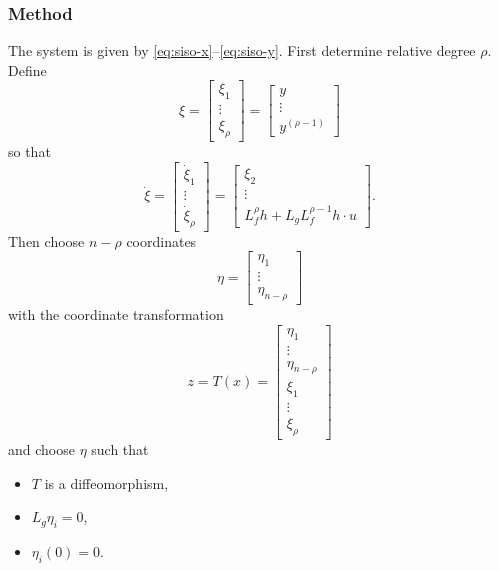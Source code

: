 \subsubsection{Method}
The system is given by \eqref{eq:siso-x}--\eqref{eq:siso-y}. First determine relative degree $\rho$. Define
\begin{equation}
	\xi =
	\begin{bmatrix}
		\xi_1 \\ \vdots \\ \xi_\rho
	\end{bmatrix}
	=
	\begin{bmatrix}
		y \\ \vdots \\ y^{(\rho-1)}
	\end{bmatrix}
\end{equation}
so that
\begin{equation}
	\dot{\xi} =
	\begin{bmatrix}
		\dot{\xi}_1 \\ \vdots \\ \dot{\xi}_\rho
	\end{bmatrix}
	=
	\begin{bmatrix}
		\xi_2 \\ \vdots \\ L_f^\rho h + L_g L_f^{\rho-1} h \cdot u
	\end{bmatrix}
	.
\end{equation}
Then choose $n-\rho$ coordinates
\begin{equation}
	\eta =
	\begin{bmatrix}
		\eta_1 \\ \vdots \\ \eta_{n-\rho}
	\end{bmatrix}
\end{equation}
with the coordinate transformation
\begin{equation}
	z = T(x) =
	\begin{bmatrix}
		\eta_1 \\ \vdots \\ \eta_{n-\rho} \\ \xi_1 \\ \vdots \\ \xi_\rho
	\end{bmatrix}
\end{equation}
and choose $\eta$ such that
\begin{itemize}
	\item $T$ is a diffeomorphism,
	\item $L_g \eta_i = 0$,
	\item $\eta_i(0) = 0$.
\end{itemize}
